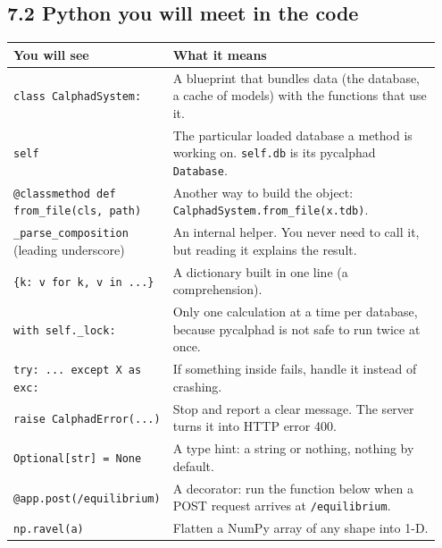 \documentclass[12pt,a4paper]{article}
\begin{document}
\subsection*{7.2 Python you will meet in the code}
\begingroup\small
\begin{longtable}{>{\raggedright\arraybackslash}p{0.279\linewidth}>{\raggedright\arraybackslash}p{0.668\linewidth}}
\toprule
\textbf{You will see} & \textbf{What it means} \\
\midrule
\endhead
\texttt{class CalphadSystem:} & A blueprint that bundles data (the database, a cache of models) with the functions that use it. \\
\texttt{self} & The particular loaded database a method is working on. \texttt{self.\allowbreak{}db} is its pycalphad \texttt{Database}. \\
\texttt{@classmethod def from\_\allowbreak{}file(cls,\allowbreak{} path)} & Another way to build the object: \texttt{CalphadSystem.\allowbreak{}from\_\allowbreak{}file(\textquotedbl{}x.\allowbreak{}tdb\textquotedbl{})}. \\
\texttt{\_\allowbreak{}parse\_\allowbreak{}composition} (leading underscore) & An internal helper. You never need to call it, but reading it explains the result. \\
\texttt{\{k: v for k,\allowbreak{} v in .\allowbreak{}.\allowbreak{}.\allowbreak{}\}} & A dictionary built in one line (a comprehension). \\
\texttt{with self.\allowbreak{}\_\allowbreak{}lock:} & Only one calculation at a time per database, because pycalphad is not safe to run twice at once. \\
\texttt{try: .\allowbreak{}.\allowbreak{}.\allowbreak{} except X as exc:} & If something inside fails, handle it instead of crashing. \\
\texttt{raise CalphadError(\textquotedbl{}.\allowbreak{}.\allowbreak{}.\allowbreak{}\textquotedbl{})} & Stop and report a clear message. The server turns it into HTTP error 400. \\
\texttt{Optional[str] = None} & A type hint: a string or nothing, nothing by default. \\
\texttt{@app.\allowbreak{}post(\textquotedbl{}/\allowbreak{}equilibrium\textquotedbl{})} & A decorator: run the function below when a POST request arrives at \texttt{/\allowbreak{}equilibrium}. \\
\texttt{np.\allowbreak{}ravel(a)} & Flatten a NumPy array of any shape into 1-D. \\
\bottomrule
\end{longtable}
\endgroup
\end{document}
